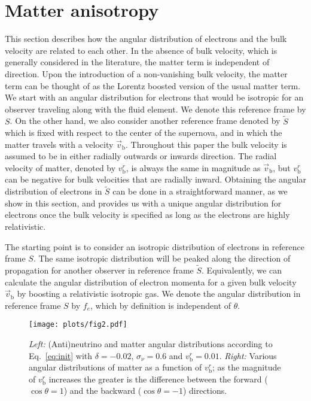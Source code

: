 \documentclass[aps, prd, 10pt, twocolumn, superscriptaddress, noshowpacs, preprintnumbers, longbibliography, groupedaddress, footinbib, bibnotes]{revtex4-1}
\newcommand{\vb}{\vec{v}_{\mathrm{b}}}
\newcommand{\vbr}{v_{\mathrm{b}}^{r}}
\begin{document}

\section{Matter anisotropy}
\label{sec:anisotropic}

This section describes how the angular distribution of electrons and the bulk velocity are related to each other. 
In the absence of bulk velocity, which is generally considered in the literature, the matter term is independent of direction. Upon the introduction of a non-vanishing bulk velocity, the matter term can be thought of as the Lorentz boosted version of the usual matter term. We start with an angular distribution for electrons that would be isotropic for an observer traveling along with the fluid element. We denote this reference frame by $S$. On the other hand, we also consider another reference frame denoted by $\widetilde{S}$ which is fixed with respect to the center of the supernova, and in which the matter travels with a velocity $\vb$. 
Throughout this paper the bulk velocity is assumed to be in either radially outwards or inwards direction. The radial velocity of matter, denoted by $\vbr$, is always the same in magnitude as $\vb$, but $\vbr$ can be negative for bulk velocities that are radially inward. Obtaining the angular distribution of electrons in $\widetilde{S}$ can be done in a straightforward manner, as we show in this section, and provides us with a unique angular distribution for electrons once the bulk velocity is specified as long as the electrons are highly relativistic. 

The starting point is to consider an isotropic distribution of electrons in reference frame $S$.
The same isotropic distribution will be peaked along the direction of propagation for another observer in reference frame $\widetilde{S}$. 
Equivalently, we can calculate the angular distribution of electron momenta for a given bulk velocity $\vb$ by boosting a relativistic isotropic gas. We denote the angular distribution in reference frame $S$ by $f_{e}$, which by definition is independent of $\theta$. 


\begin{figure*}[t!]
\centering
\texttt{[image: plots/fig2.pdf]}
\caption{ 
\textit{Left:} (Anti)neutrino and matter angular distributions according to Eq.~\ref{eq:init} with $\delta=-0.02$, $\sigma_{\nu}=0.6$ and $\vbr=0.01$. \textit{Right:} Various angular distributions of matter as a function of $\vbr$; as the magnitude of $\vbr$ increases the greater is the difference between the forward ($\cos{\theta}=1$) and the backward ($\cos{\theta}=-1$) directions.
}
\label{fig:2pr}
\end{figure*}
\end{document}
